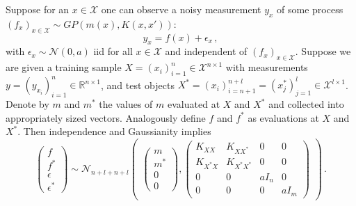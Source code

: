 \documentclass[a4paper,14pt]{article}
\newcommand{\Ncal}{\mathcal{N}}
\newcommand{\Xcal}{\mathcal{X}}
\newcommand{\Real}{\mathbb{R}}
\begin{document}
Suppose for an $x\in\Xcal$ one can observe a noisy measurement $y_x$ of some process
$(f_x)_{x\in\Xcal} \sim GP(m(x), K(x,x'))$:
$$ y_x = f(x) + \epsilon_x \,, $$
with $\epsilon_x\sim \Ncal(0,a)$ iid for all $x\in \Xcal$ and independent of
$(f_x)_{x\in\Xcal}$. Suppose we are given a training sample $X=(x_i)_{i=1}^n\in\Xcal^{n\times 1}$
with measurements $y = (y_{x_i})_{i=1}^n\in\Real^{n\times 1}$, and test objects
$X^* = (x_i)_{i=n+1}^{n+l} = (x^*_j)_{j=1}^l\in\Xcal^{l\times 1}$. Denote by $m$
and $m^*$ the values of $m$ evaluated at $X$ and $X^*$ and collected into appropriately
sized vectors. Analogously define $f$ and $f^*$ as evaluations at $X$ and $X^*$.
Then independence and Gaussianity implies 
$$ \begin{pmatrix} f \\ f^* \\ \epsilon \\ \epsilon^* \end{pmatrix}
  \sim \Ncal_{n+l+n+l}\begin{pmatrix}
      \begin{pmatrix} m \\ m^* \\0 \\ 0 \end{pmatrix},
      \begin{pmatrix}
        K_{XX} & K_{XX^*} & 0 & 0 \\
        K_{X^*X} & K_{X^*X^*} & 0 & 0 \\
        0 & 0 & a I_n & 0 \\
        0 & 0 & 0 & a I_m
      \end{pmatrix}
    \end{pmatrix}
  \,. $$
\end{document}
